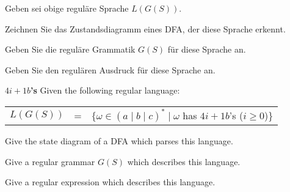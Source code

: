 \documentclass[a4paper]{exam}
\theoremstyle{remark}
\newenvironment{grammar}
	{\begin{tabular}[b]{lcl}}
	{\end{tabular}}
\newcommand{\rewritten}{$\to$}
\newcommand{\alternative}{$\mid \;$}
\begin{document}
\begin{questions}
	\begin{otherlanguage}{german}
		Geben sei obige reguläre Sprache $L(G(S))$.
		
		\begin{parts}
			\item Zeichnen Sie das Zustandsdiagramm eines DFA, der diese Sprache erkennt.
			\item Geben Sie die reguläre Grammatik $G(S)$ für diese Sprache an.
			\item Geben Sie den regulären Ausdruck für diese Sprache an.
		\end{parts}
	\end{otherlanguage}

	\begin{solution}
	\end{solution}

\question
	\textbf{$4i + 1 b$'s}
	Given the following regular language:
	
	\begin{tabular}[b]{lcl}
		$L(G(S))$ & = & $\{\omega \in (a \mid b \mid c)^* \mid \omega$ has $4i + 1 b$'s ($i \geq 0$)\}
	\end{tabular}

	\begin{parts}
		\item Give the state diagram of a DFA which parses this language.
		\item Give a regular grammar $G(S)$ which describes this language.
		\item Give a regular expression which describes this language.		
	\end{parts}
	

\end{questions}
\end{document}
